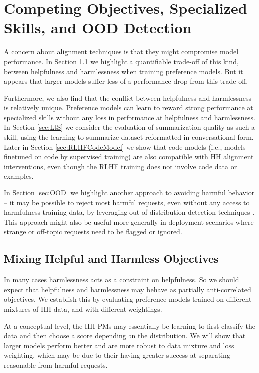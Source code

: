 \section{Competing Objectives, Specialized Skills, and OOD Detection}

A concern about alignment techniques is that they might compromise model performance.    In Section \ref{sec:HHMix} we  highlight a quantifiable trade-off of this kind, between helpfulness and harmlessness when training preference models. But it appears that larger models suffer less of a performance drop from this trade-off.

Furthermore, we also find that the conflict between helpfulness and harmlessness is relatively unique. Preference models can learn to reward strong performance at specialized skills without any loss in performance at helpfulness and harmlessness.  In Section \ref{sec:LtS} we consider the evaluation of summarization quality as such a skill, using the learning-to-summarize \cite{stiennon2020learning} dataset reformatted in conversational form.  Later in Section \ref{sec:RLHFCodeModel} we show that code models (i.e., models finetuned on code by supervised training) are also compatible with HH alignment interventions, even though the RLHF training does not involve code data or examples.

In Section \ref{sec:OOD} we highlight another approach to avoiding harmful behavior -- it may be possible to reject most harmful requests, even without any access to harmfulness training data, by leveraging out-of-distribution detection techniques \cite{fort2021exploring}.  This approach might  also be useful more generally in deployment scenarios where strange or off-topic requests need to be flagged or ignored.

\subsection{Mixing Helpful and Harmless Objectives}
\label{sec:HHMix}
In many cases harmlessness acts as a constraint on helpfulness.  So we should expect that helpfulness and harmlessness may behave as partially anti-correlated objectives.  We establish this by evaluating preference models trained on different mixtures of HH data, and with different weightings. 

At a conceptual level, the HH PMs may essentially be learning to first classify the data and then choose a score depending on the distribution.  We will show that larger models perform better and are more robust to data mixture and loss weighting, which may be due to their having greater success at separating reasonable from harmful requests.


